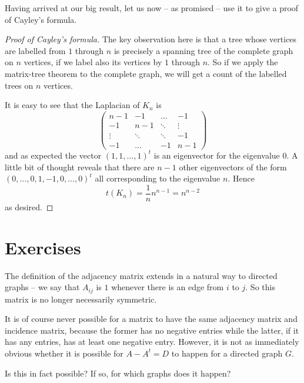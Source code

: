 \documentclass[nobib]{tufte-handout}
\begin{document}
Having arrived at our big result, let us now -- as promised -- use it to give a proof of Cayley's formula.

\begin{proof}[Proof of Cayley's formula]
    The key observation here is that a tree whose vertices are labelled from $1$ through $n$ is precisely a spanning tree of the complete graph on $n$ vertices, if we label also its vertices by $1$ through $n$. So if we apply the matrix-tree theorem to the complete graph, we will get a count of the labelled trees on $n$ vertices.

    It is easy to see that the Laplacian of $K_n$ is
    $$\begin{pmatrix}
        n-1 & -1 & \dots & -1 \\
        -1 & n-1 & \ddots & \vdots \\
        \vdots & \ddots & \ddots & -1 \\
        -1 & \dots & -1 & n-1
       \end{pmatrix}$$
    and as expected the vector $(1,1,\ldots,1)^t$ is an eigenvector for the eigenvalue $0$. A little bit of thought reveals that there are $n-1$ other eigenvectors of the form $(0,\ldots,0,1,-1,0,\ldots,0)^t$ all corresponding to the eigenvalue $n$. Hence
    $$t(K_n) = \frac{1}{n}n^{n-1} = n^{n-2}$$
    as desired.
\end{proof}

\section{Exercises}

\begin{xca}
    The definition of the adjacency matrix extends in a natural way to directed graphs -- we say that $A_{ij}$ is $1$ whenever there is an edge from $i$ to $j$. So this matrix is no longer necessarily symmetric.

    It is of course never possible for a matrix to have the same adjacency matrix and incidence matrix, because the former has no negative entries while the latter, if it has any entries, has at least one negative entry. However, it is not as immediately obvious whether it is possible for $A - A^t = D$ to happen for a directed graph $G$.

    Is this in fact possible? If so, for which graphs does it happen?
\end{xca}

%
%
\end{document}
